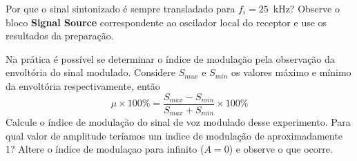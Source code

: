 \documentclass[12pt,addpoints]{exam}
\begin{document}
\begin{questions}
    \question Por que o sinal sintonizado é sempre transladado para $f_{i} = 25$~kHz? Observe o bloco \textbf{Signal Source} correspondente ao oscilador local do receptor e use os resultados da preparação.
    \fillwithlines{1in}
    
    \question Na prática é possível se determinar o índice de modulação pela observação da envoltória do sinal modulado. Considere $S_{max}$ e $S_{min}$ os valores máximo e mínimo da envoltória respectivamente, então
    \begin{equation}
      \label{eq:mu100}
      \mu \times 100\% = \frac{S_{max} - S_{min}}{S_{max} + S_{min}}
      \times 100\%
    \end{equation}
    Calcule o índice de modulação do sinal de voz modulado desse experimento. Para qual valor de amplitude teríamos um indice de modulação de aproximadamente 1? Altere o índice de modulaçao para infinito ($A = 0$) e observe o que ocorre.
    \fillwithlines{0.5in}

\end{questions}
\end{document}
